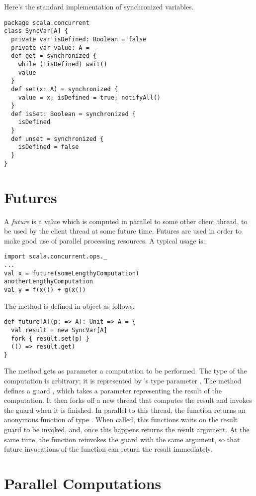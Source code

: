{Here's the standard implementation of synchronized variables.
\begin{lstlisting}
package scala.concurrent
class SyncVar[A] {
  private var isDefined: Boolean = false
  private var value: A = _
  def get = synchronized {
    while (!isDefined) wait()
    value
  }
  def set(x: A) = synchronized {
    value = x; isDefined = true; notifyAll()
  }
  def isSet: Boolean = synchronized {
    isDefined
  }
  def unset = synchronized {
    isDefined = false
  }
}
\end{lstlisting}

\section{Futures}
\label{sec:futures}

A {\em future} is a value which is computed in parallel to some other
client thread, to be used by the client thread at some future time.
Futures are used in order to make good use of parallel processing
resources.  A typical usage is:

\begin{lstlisting}
import scala.concurrent.ops._
...
val x = future(someLengthyComputation)
anotherLengthyComputation
val y = f(x()) + g(x())
\end{lstlisting}

The  method is defined in object
 as follows.
\begin{lstlisting}
def future[A](p: => A): Unit => A = {
  val result = new SyncVar[A]
  fork { result.set(p) }
  (() => result.get)
}
\end{lstlisting}

The  method gets as parameter a computation  to
be performed. The type of the computation is arbitrary; it is
represented by 's type parameter .  The
 method defines a guard , which takes a
parameter representing the result of the computation. It then forks
off a new thread that computes the result and invokes the
 guard when it is finished. In parallel to this thread,
the function returns an anonymous function of type .
When called, this functions waits on the result guard to be
invoked, and, once this happens returns the result argument.
At the same time, the function reinvokes the  guard with
the same argument, so that future invocations of the function can
return the result immediately.

\section{Parallel Computations}

}
